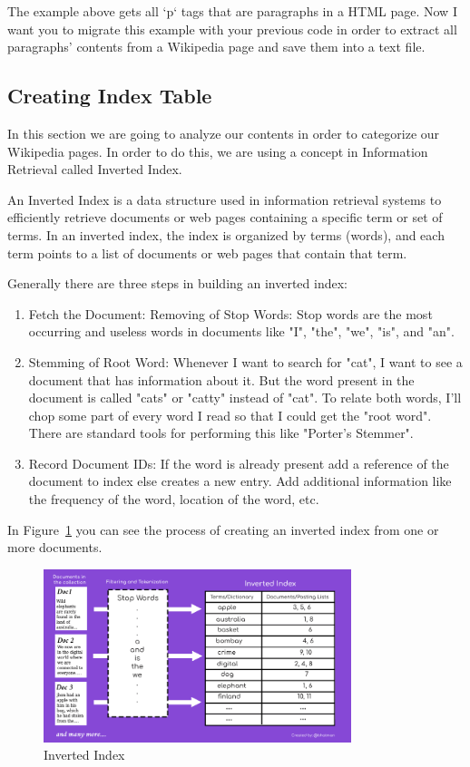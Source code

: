 \documentclass{article}
\begin{document}
The example above gets all `p` tags that are paragraphs in a HTML page. Now I want you to migrate
this example with your previous code in order to extract all paragraphs' contents from a Wikipedia page
and save them into a text file.

\subsection{Creating Index Table}
In this section we are going to analyze our contents in order to categorize our Wikipedia pages. In order to do this,
we are using a concept in Information Retrieval called Inverted Index.

An Inverted Index is a data structure used in information retrieval systems to efficiently retrieve documents or web pages
containing a specific term or set of terms.
In an inverted index, the index is organized by terms (words), and each term points to a list of documents or web pages that contain that term.

Generally there are three steps in building an inverted index:
\begin{enumerate}
    \item Fetch the Document: Removing of Stop Words: Stop words are the most occurring and useless words in documents like "I", "the", "we", "is", and "an".
    \item Stemming of Root Word: Whenever I want to search for "cat", I want to see a document that has information about it. But the word present in the document is called "cats" or "catty" instead of "cat". To relate both words, I'll chop some part of every word I read so that I could get the "root word". There are standard tools for performing this like "Porter's Stemmer".
    \item Record Document IDs: If the word is already present add a reference of the document to index else creates a new entry. Add additional information like the frequency of the word, location of the word, etc.
\end{enumerate}

In Figure~\ref{fig:invertindex} you can see the process of creating an inverted index from one or more documents.

\begin{figure}[h]
    \centering
    \includegraphics[width=0.8\textwidth]{./pics/invert-index.png}
    \caption{Inverted Index}
    \label{fig:invertindex}
\end{figure}
\end{document}
